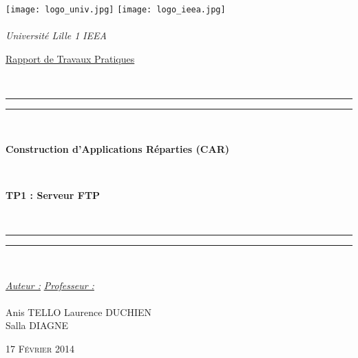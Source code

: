 \thispagestyle{cover}

\texttt{[image: logo\_univ.jpg]} \hfill \texttt{[image: logo\_ieea.jpg]} \\
~\\
\hspace*{0.5cm} {\Large \textit{Université Lille 1}} \hfill {\Large \textit{IEEA}} \hspace*{0.5cm}\\

\vspace*{17mm}

\begin{center}
	\begin{Huge} \underline{Rapport de Travaux Pratiques} \end{Huge}\\[4mm]

	\vspace*{15mm}

	\rule[0.5ex]{\linewidth}{2pt}\vspace*{-\baselineskip}\vspace*{3.2pt}
	\rule[0.5ex]{\linewidth}{1pt}\\[\baselineskip]

		\begin{Huge} \textbf{Construction d'Applications Réparties (CAR)} \end{Huge}\\[4mm]
		\begin{Huge} \textbf{TP1 : Serveur FTP} \end{Huge}\\[4mm]

	\rule[0.5ex]{\linewidth}{1pt}\vspace*{-\baselineskip}\vspace{3.2pt}
	\rule[0.5ex]{\linewidth}{2pt}\\

	\vspace*{20mm}

	{\large \textit{\underline{Auteur :}}} \hfill {\large \textit{\underline{Professeur :}}}\\
	~\\
	{\large Anis TELLO} \hfill {\large Laurence DUCHIEN}\\
	{\large Salla DIAGNE} \hfill {\large}
	
	\vspace*{20mm}
	
	{\large\textsc{17 Février 2014}}
\end{center}